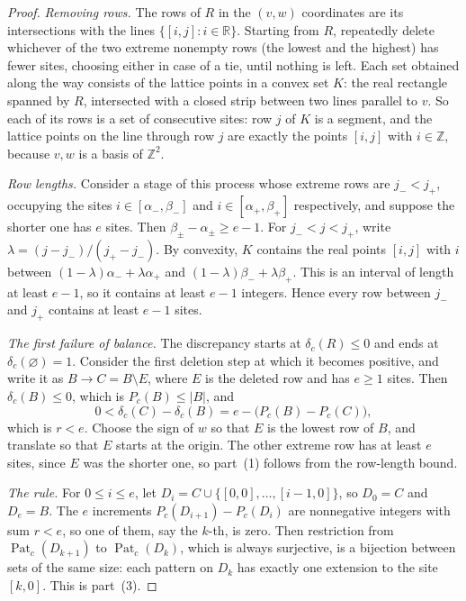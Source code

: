 \documentclass[11pt,a4paper,reqno]{amsart}
\theoremstyle{definition}
\theoremstyle{remark}
\newcommand{\Z}{\mathbb Z}
\newcommand{\R}{\mathbb R}
\newcommand{\rc}[2]{[#1,#2]}
\DeclareMathOperator{\Pat}{Pat}
\numberwithin{equation}{section}
\begin{document}
\begin{proof}
\emph{Removing rows.} The rows of $R$ in the $(v,w)$ coordinates are its intersections with the lines $\{\rc ij:i\in\R\}$. Starting from $R$, repeatedly delete whichever of the two extreme nonempty rows (the lowest and the highest) has fewer sites, choosing either in case of a tie, until nothing is left. Each set obtained along the way consists of the lattice points in a convex set $K$: the real rectangle spanned by $R$, intersected with a closed strip between two lines parallel to $v$. So each of its rows is a set of consecutive sites: row $j$ of $K$ is a segment, and the lattice points on the line through row $j$ are exactly the points $\rc ij$ with $i\in\Z$, because $v,w$ is a basis of $\Z^2$.

\emph{Row lengths.} Consider a stage of this process whose extreme rows are $j_-<j_+$, occupying the sites $i\in[\alpha_-,\beta_-]$ and $i\in[\alpha_+,\beta_+]$ respectively, and suppose the shorter one has $e$ sites. Then $\beta_\pm-\alpha_\pm\ge e-1$. For $j_-<j<j_+$, write $\lambda=(j-j_-)/(j_+-j_-)$. By convexity, $K$ contains the real points $\rc ij$ with $i$ between $(1-\lambda)\alpha_-+\lambda\alpha_+$ and $(1-\lambda)\beta_-+\lambda\beta_+$. This is an interval of length at least $e-1$, so it contains at least $e-1$ integers. Hence every row between $j_-$ and $j_+$ contains at least $e-1$ sites.

\emph{The first failure of balance.} The discrepancy starts at $\delta_c(R)\le0$ and ends at $\delta_c(\varnothing)=1$. Consider the first deletion step at which it becomes positive, and write it as $B\to C=B\setminus E$, where $E$ is the deleted row and has $e\ge1$ sites. Then $\delta_c(B)\le0$, which is $P_c(B)\le|B|$, and
\[
 0<\delta_c(C)-\delta_c(B)=e-\bigl(P_c(B)-P_c(C)\bigr),
\]
which is $r<e$. Choose the sign of $w$ so that $E$ is the lowest row of $B$, and translate so that $E$ starts at the origin. The other extreme row has at least $e$ sites, since $E$ was the shorter one, so part~(1) follows from the row-length bound.

\emph{The rule.} For $0\le i\le e$, let $D_i=C\cup\{\rc00,\ldots,\rc{i-1}0\}$, so $D_0=C$ and $D_e=B$. The $e$ increments $P_c(D_{i+1})-P_c(D_i)$ are nonnegative integers with sum $r<e$, so one of them, say the $k$-th, is zero. Then restriction from $\Pat_c(D_{k+1})$ to $\Pat_c(D_k)$, which is always surjective, is a bijection between sets of the same size: each pattern on $D_k$ has exactly one extension to the site $\rc k0$. This is part~(3).
\end{proof}
\end{document}
